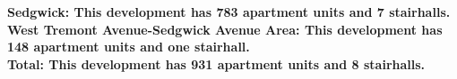 \bf{Sedgwick}: This development has 783 apartment units and 7 stairhalls.\\\bf{West Tremont Avenue-Sedgwick Avenue Area}: This development has 148 apartment units and one stairhall.\\\bf{Total}: This development has 931 apartment units and 8 stairhalls.\\